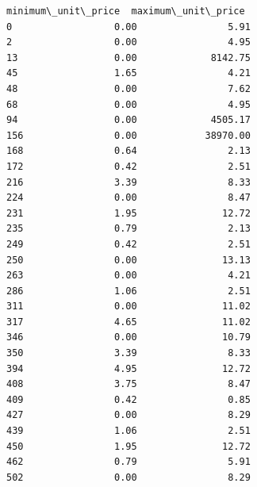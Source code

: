 \documentclass[11pt]{article}
\begin{document}
\begin{Verbatim}[commandchars=\\\{\}]
     minimum\_unit\_price  maximum\_unit\_price  
0                  0.00                5.91  
2                  0.00                4.95  
13                 0.00             8142.75  
45                 1.65                4.21  
48                 0.00                7.62  
68                 0.00                4.95  
94                 0.00             4505.17  
156                0.00            38970.00  
168                0.64                2.13  
172                0.42                2.51  
216                3.39                8.33  
224                0.00                8.47  
231                1.95               12.72  
235                0.79                2.13  
249                0.42                2.51  
250                0.00               13.13  
263                0.00                4.21  
286                1.06                2.51  
311                0.00               11.02  
317                4.65               11.02  
346                0.00               10.79  
350                3.39                8.33  
394                4.95               12.72  
408                3.75                8.47  
409                0.42                0.85  
427                0.00                8.29  
439                1.06                2.51  
450                1.95               12.72  
462                0.79                5.91  
502                0.00                8.29  
    \end{Verbatim}
\end{document}

